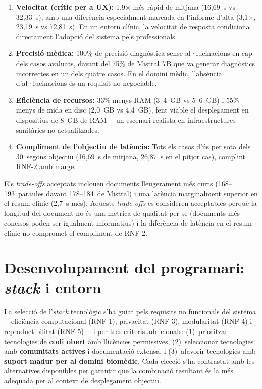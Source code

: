 \documentclass[CAT]{TFUOC}%
\begin{document}
\begin{enumerate}
    \item \textbf{Velocitat (crític per a UX):} 1,9$\times$ més ràpid de mitjana (16,69~s vs 32,33~s), amb una diferència especialment marcada en l'informe d'alta (3,1$\times$, 23,19~s vs 72,81~s). En un entorn clínic, la velocitat de resposta condiciona directament l'adopció del sistema pels professionals.

    \item \textbf{Precisió mèdica:} 100\% de precisió diagnòstica sense al·lucinacions en cap dels casos avaluats, davant del 75\% de Mistral~7B que va generar diagnòstics incorrectes en un dels quatre casos. En el domini mèdic, l'absència d'al·lucinacions és un requisit no negociable.

    \item \textbf{Eficiència de recursos:} 33\% menys RAM (3--4~GB vs 5--6~GB) i 55\% menys de mida en disc (2,0~GB vs 4,4~GB), fent viable el desplegament en dispositius de 8~GB de RAM ---un escenari realista en infraestructures sanitàries no actualitzades.

    \item \textbf{Compliment de l'objectiu de latència:} Tots els casos d'ús per sota dels 30~segons objectiu (16,69~s de mitjana, 26,87~s en el pitjor cas), complint RNF-2 amb marge.
\end{enumerate}

Els \textit{trade-offs} acceptats inclouen documents lleugerament més curts (168--193~paraules davant 178--184~de Mistral) i una latència marginalment superior en el resum clínic (2,7~s més). Aquests \textit{trade-offs} es consideren acceptables perquè la longitud del document no és una mètrica de qualitat per se (documents més concisos poden ser igualment informatius) i la diferència de latència en el resum clínic no compromet el compliment de RNF-2.

\section{Desenvolupament del programari: \textit{stack} i entorn}

La selecció de l'\textit{stack} tecnològic s'ha guiat pels requisits no funcionals del sistema ---eficiència computacional (RNF-1), privacitat (RNF-3), modularitat (RNF-4) i reproductibilitat (RNF-5)--- i per tres criteris addicionals: (1)~prioritzar tecnologies de \textbf{codi obert} amb llicències permissives, (2)~seleccionar tecnologies amb \textbf{comunitats actives} i documentació extensa, i (3)~afavorir tecnologies amb \textbf{suport madur per al domini biomèdic}. Cada elecció s'ha contrastat amb les alternatives disponibles per garantir que la combinació resultant és la més adequada per al context de desplegament objectiu.
\end{document}
